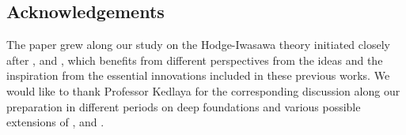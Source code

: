 \documentclass[12pt]{amsart}
\theoremstyle{definition}
\numberwithin{equation}{section}
\begin{document}
\newpage

\subsection*{Acknowledgements} 

The paper grew along our study on the Hodge-Iwasawa theory initiated closely after \cite{KP}, \cite{KL15} and \cite{KL16}, which benefits from different perspectives from the ideas and the inspiration from the essential innovations included in these previous works. We would like to thank Professor Kedlaya for the corresponding discussion along our preparation in different periods on deep foundations and various possible extensions of \cite{KP}, \cite{KL15} and \cite{KL16}.











\newpage
\end{document}
